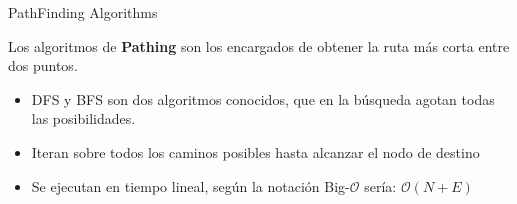 \documentclass[10pt,spanish,xcolor={svgnames}]{beamer}
\begin{document}
\begin{frame}{PathFinding Algorithms}
\vspace*{-2em}
\begin{alertblock}{\small}
Los algoritmos de \alert{\textbf{Pathing}} son los encargados de obtener la ruta más corta entre dos puntos.
\begin{itemize}
\item DFS y BFS son dos algoritmos conocidos, que en la búsqueda agotan todas las posibilidades.
\item Iteran sobre todos los caminos posibles hasta alcanzar el nodo de destino
\item Se ejecutan en tiempo lineal, según la notación Big-$\mathcal{O}$ sería: $\mathcal{O}(N+E)$
\end{itemize}
\end{alertblock}
\end{frame}
\end{document}
